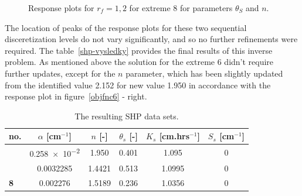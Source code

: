 \documentclass[review,times,3p,twocolumn,10pt]{elsarticle}
\newcommand{\fs}{\footnotesize}
\begin{document}
\begin{figure}[htb!]
\label{ext6rf1-an2-example}
\caption{Response plots for $r_f=1,2$ for extreme 8 for parameters $\theta_S$ and $n$.}
\end{figure}


The location of peaks of the response plots for these two sequential disceretization levels do not vary significantly, and so no further refinements were required. The table~\ref{shp-vysledky} provides the final results of this inverse problem. As mentioned above the solution for the extreme 6 didn't require further updates, except for  the $n$ parameter, which has been slightly updated from the identified value 2.152 for new value 1.950 in accordance with the response plot in figure~\ref{objfnc6} - right.

\begin{table}[ht]
\centering
\caption{The resulting SHP data sets.}
\fs
\begin{tabular}{l || c c c c c }
\toprule
no. & $\alpha$ [cm$^{-1}$] & $n$ [-] & $\theta_s$ [-] & $K_s$ [cm.hrs$^{-1}$] & $S_s$  [cm$^{-1}$]\\ \hline \hline
\rowcolor{white}{\bf 6} & \num{0.258e-2} & \num{1.950}  & 0.401 &  \num{1.095} & 0  \\ 
\rowcolor{white}{\bf 7} & \num{0.0032285} & \num{1.4421} & 0.513 &  \num{1.0995} & 0  \\ 
\rowcolor{white} {\bf 8} & \num{0.002276} & \num{1.5189} & 0.236 &  \num{1.0356} &  \num{0}\\ \hline
\toprule
\end{tabular}
\label{shp-vysledky-final}
\end{table}
\end{document}
